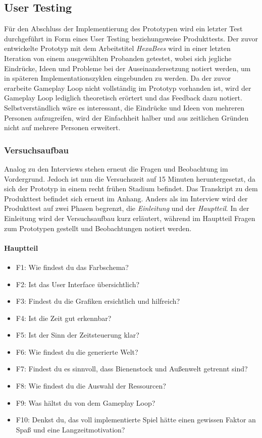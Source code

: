 \subsection{User Testing}
Für den Abschluss der Implementierung des Prototypen wird ein letzter Test durchgeführt in Form eines User Testing beziehungsweise Produkttests. Der zuvor entwickelte Prototyp mit dem Arbeitstitel \textit{HexaBees} wird in einer letzten Iteration von einem ausgewählten Probanden getestet, wobei sich jegliche Eindrücke, Ideen und Probleme bei der Auseinandersetzung notiert werden, um in späteren Implementationszyklen eingebunden zu werden. Da der zuvor erarbeite Gameplay Loop nicht vollständig im Prototyp vorhanden ist, wird der Gameplay Loop lediglich theoretisch erörtert und das Feedback dazu notiert. Selbstverständlich wäre es interessant, die Eindrücke und Ideen von mehreren Personen aufzugreifen, wird der Einfachheit halber und aus zeitlichen Gründen nicht auf mehrere Personen erweitert.

\subsubsection{Versuchsaufbau}
Analog zu den Interviews stehen erneut die Fragen und Beobachtung im Vordergrund. Jedoch ist nun die Versuchszeit auf 15 Minuten heruntergesetzt, da sich der Prototyp in einem recht frühen Stadium befindet. Das Transkript zu dem Produkttest befindet sich erneut im Anhang. Anders als im Interview wird der Produkttest auf zwei Phasen begrenzt, die \textit{Einleitung} und der \textit{Hauptteil}. In der Einleitung wird der Versuchsaufbau kurz erläutert, während im Hauptteil Fragen zum Prototypen gestellt und Beobachtungen notiert werden.

\paragraph{Hauptteil}
\begin{itemize}
    \item F1: Wie findest du das Farbschema?
    \item F2: Ist das User Interface übersichtlich?
    \item F3: Findest du die Grafiken ersichtlich und hilfreich?
    \item F4: Ist die Zeit gut erkennbar?
    \item F5: Ist der Sinn der Zeitsteuerung klar?
    \item F6: Wie findest du die generierte Welt?
    \item F7: Findest du es sinnvoll, dass Bienenstock und Außenwelt getrennt sind?
    \item F8: Wie findest du die Auswahl der Ressourcen?
    \item F9: Was hältst du von dem Gameplay Loop?
    \item F10: Denkst du, das voll implementierte Spiel hätte einen gewissen Faktor an Spaß und eine Langzeitmotivation?
\end{itemize}

